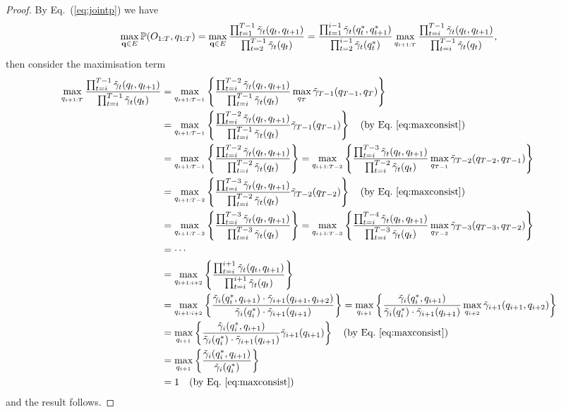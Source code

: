 \begin{proof}
By Eq.~(\ref{eq:jointp}) we have
\begin{equation*}
\max_{\mathbf{q} \in E} \mathbb{P}(O_{1:T}, q_{1:T}) 
= \max_{\mathbf{q} \in E} \frac{\prod_{t=1}^{T-1} \tilde{\gamma}_t(q_t, q_{t+1})} {\prod_{t=2}^{T-1} \tilde{\gamma}_t(q_t)}  
= \frac{\prod_{t=1}^{i-1} \tilde{\gamma}_t(q_t^*, q_{t+1}^*)} {\prod_{t=2}^{i-1} \tilde{\gamma}_t(q_t^*)} 
  \max_{q_{i+1:T}} \frac{\prod_{t=i}^{T-1} \tilde{\gamma}_t(q_t, q_{t+1})} {\prod_{t=i}^{T-1} \tilde{\gamma}_t(q_t)},
\end{equation*}
then consider the maximisation term
\begin{align*}
\max_{q_{i+1:T}} \frac{\prod_{t=i}^{T-1} \tilde{\gamma}_t(q_t, q_{t+1})} {\prod_{t=i}^{T-1} \tilde{\gamma}_t(q_t)}
&= \max_{q_{i+1:T-1}} \left\{ \frac{\prod_{t=i}^{T-2} \tilde{\gamma}_t(q_t, q_{t+1})} {\prod_{t=i}^{T-1} \tilde{\gamma}_t(q_t)}
   \max_{q_{T}} \tilde{\gamma}_{T-1}(q_{T-1}, q_T) \right\} \\
&= \max_{q_{i+1:T-1}} \left\{ \frac{\prod_{t=i}^{T-2} \tilde{\gamma}_t(q_t, q_{t+1})} {\prod_{t=i}^{T-1} \tilde{\gamma}_t(q_t)}
   \tilde{\gamma}_{T-1}(q_{T-1}) \right\} 
   ~~~ \text{(by Eq.~\ref{eq:maxconsist})} \\
&= \max_{q_{i+1:T-1}} \left\{ \frac{\prod_{t=i}^{T-2} \tilde{\gamma}_t(q_t, q_{t+1})} {\prod_{t=i}^{T-2} \tilde{\gamma}_t(q_t)} \right\}
 = \max_{q_{i+1:T-2}} \left\{ \frac{\prod_{t=i}^{T-3} \tilde{\gamma}_t(q_t, q_{t+1})} {\prod_{t=i}^{T-2} \tilde{\gamma}_t(q_t)}
   \max_{q_{T-1}} \tilde{\gamma}_{T-2}(q_{T-2}, q_{T-1}) \right\} \\
&= \max_{q_{i+1:T-2}} \left\{ \frac{\prod_{t=i}^{T-3} \tilde{\gamma}_t(q_t, q_{t+1})} {\prod_{t=i}^{T-2} \tilde{\gamma}_t(q_t)}
   \tilde{\gamma}_{T-2}(q_{T-2}) \right\}
   ~~~ \text{(by Eq.~\ref{eq:maxconsist})} \\
&= \max_{q_{i+1:T-2}} \left\{ \frac{\prod_{t=i}^{T-3} \tilde{\gamma}_t(q_t, q_{t+1})} {\prod_{t=i}^{T-3} \tilde{\gamma}_t(q_t)} \right\}
 = \max_{q_{i+1:T-3}} \left\{ \frac{\prod_{t=i}^{T-4} \tilde{\gamma}_t(q_t, q_{t+1})} {\prod_{t=i}^{T-3} \tilde{\gamma}_t(q_t)}
   \max_{q_{T-2}} \tilde{\gamma}_{T-3}(q_{T-3}, q_{T-2}) \right\} \\
&= \cdots \\
&= \max_{q_{i+1:i+2}} \left\{ \frac{\prod_{t=i}^{i+1} \tilde{\gamma}_t(q_t, q_{t+1})} {\prod_{t=i}^{i+1} \tilde{\gamma}_t(q_t)} \right\} \\
&= \max_{q_{i+1:i+2}} \left\{ \frac{\tilde{\gamma}_i(q_i^*, q_{i+1}) \cdot \tilde{\gamma}_{i+1}(q_{i+1}, q_{i+2})} 
                                   {\tilde{\gamma}_i(q_i^*) \cdot \tilde{\gamma}_{i+1}(q_{i+1})} \right\}
 = \max_{q_{i+1}} \left\{ \frac{\tilde{\gamma}_i(q_i^*, q_{i+1})} 
                               {\tilde{\gamma}_i(q_i^*) \cdot \tilde{\gamma}_{i+1}(q_{i+1})} 
                          \max_{q_{i+2}} \tilde{\gamma}_{i+1}(q_{i+1}, q_{i+2}) \right\} \\
&= \max_{q_{i+1}} \left\{ \frac{\tilde{\gamma}_i(q_i^*, q_{i+1})} 
                               {\tilde{\gamma}_i(q_i^*) \cdot \tilde{\gamma}_{i+1}(q_{i+1})} \tilde{\gamma}_{i+1}(q_{i+1}) \right\}
   ~~~ \text{(by Eq.~\ref{eq:maxconsist})} \\
&= \max_{q_{i+1}} \left\{ \frac{\tilde{\gamma}_i(q_i^*, q_{i+1})} {\tilde{\gamma}_i(q_i^*)} \right\} \\
&= 1 ~~~ \text{(by Eq.~\ref{eq:maxconsist})}
\end{align*}
and the result follows.
\end{proof}
